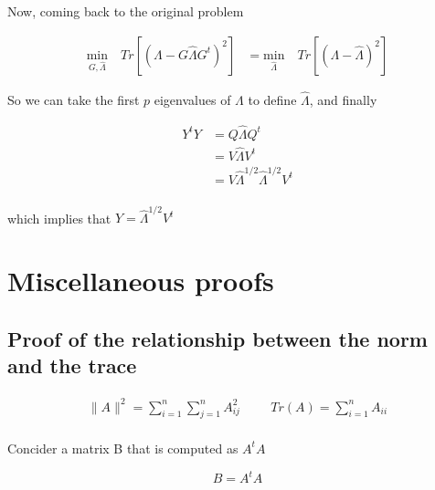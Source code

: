 \documentclass{article}
\begin{document}
    Now, coming back to the original problem

    \begin{equation*}
        \begin{aligned}
            \underset{G,\hat{\Lambda}}{\text{min}} \quad Tr[(\Lambda - G \hat{\Lambda} G^t)^2]
            &=
            \underset{\hat{\Lambda}}{\text{min}} \quad Tr[(\Lambda - \hat{\Lambda})^2]
        \end{aligned}
    \end{equation*}

    So we can take the first $p$ eigenvalues of $\Lambda$ to define $\hat{\Lambda}$,
    and finally

    \begin{equation*}
        \begin{aligned}
            Y^tY &= Q \hat{\Lambda} Q^t\\
            &=
            V \hat{\Lambda} V^t\\
            &=
            V \hat{\Lambda}^{1/2} \hat{\Lambda}^{1/2} V^t\\
        \end{aligned}
    \end{equation*}

    which implies that $Y = \hat{\Lambda}^{1/2} V^t$

    \section{Miscellaneous proofs}

    \subsection{Proof of the relationship between the norm and the trace} \label{norm_trace}

    \begin{equation*}
        \begin{aligned}
            \lVert A \rVert^2 = \sum_{i=1}^n \sum_{j=1}^n A_{ij}^2
            \hspace{1cm}
            Tr(A) = \sum_{i=1}^n A_{ii}
        \end{aligned}
    \end{equation*}\\

    Concider a matrix B that is computed as $A^tA$

    \begin{equation*}
        B = A^tA
    \end{equation*}
\end{document}

